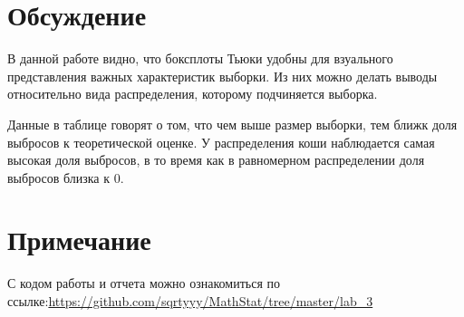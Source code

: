 \documentclass[a4paper]{article}
\begin{document}
\section{Обсуждение}
В данной работе видно, что боксплоты Тьюки удобны для взуального представления важных
характеристик выборки. Из них можно делать выводы относительно
вида распределения, которому подчиняется выборка.

Данные в таблице говорят о том, что чем выше размер выборки, тем ближк доля выбросов к теоретической оценке. У распределения коши наблюдается самая высокая доля выбросов, в то время как в равномерном распределении доля выбросов близка к 0.

\section{Примечание}

С кодом работы и отчета можно ознакомиться по ссылке:\;\url{https://github.com/sqrtyyy/MathStat/tree/master/lab_3}
\end{document}
